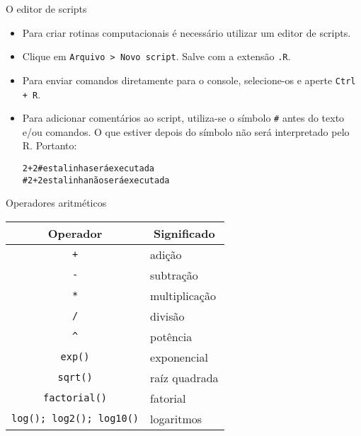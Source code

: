 \documentclass[10pt,handout]{beamer}\usepackage{graphicx, color}
\makeatletter
\newcommand{\hlcomment}[1]{\textcolor[rgb]{0.2,0.2,0.2}{#1}}%
\newenvironment{kframe}{%
 \def\at@end@of@kframe{}%
 \ifinner\ifhmode%
  \def\at@end@of@kframe{\end{minipage}}%
  \begin{minipage}{\columnwidth}%
 \fi\fi%
 \def\FrameCommand##1{\hskip\@totalleftmargin \hskip-\fboxsep
 \colorbox{shadecolor}{##1}\hskip-\fboxsep
     \hskip-\linewidth \hskip-\@totalleftmargin \hskip\columnwidth}%
 \MakeFramed {\advance\hsize-\width
   \@totalleftmargin\z@ \linewidth\hsize
   \@setminipage}}%
 {\par\unskip\endMakeFramed%
 \at@end@of@kframe}
\newenvironment{knitrout}{}{} %
\makeatother
\begin{document}
\begin{frame}[fragile=singleslide]{O editor de scripts}
  \begin{itemize}
  \item Para criar rotinas computacionais é necessário utilizar um editor
    de scripts.
  \item Clique em \texttt{Arquivo > Novo script}. Salve com a extensão
    \texttt{.R}.
  \item Para enviar comandos diretamente para o console, selecione-os e
    aperte \texttt{Ctrl + R}.
  \item Para adicionar comentários ao script, utiliza-se o símbolo
    \texttt{\#} antes do texto e/ou comandos. O que estiver depois do
    símbolo não será interpretado pelo R. Portanto:
\begin{knitrout}\small
{}\color{fgcolor}\begin{kframe}
\begin{alltt}
2 + 2     \hlcomment{# esta linha será executada}
\hlcomment{# 2 + 2     esta linha não será executada}
\end{alltt}
\end{kframe}
\end{knitrout}

\end{itemize}
\end{frame}


\begin{frame}[fragile=singleslide]{Operadores aritméticos}
\begin{table}[!ht]
    \centering
        \begin{tabular}{cl}
        \hline
        \multicolumn{0}{c}{Operador} & \multicolumn{1}{c}{Significado} \\
        \hline
        \verb|+| & adição \\
        \verb|-| & subtração \\
        \verb|*| & multiplicação \\
        \verb|/| & divisão \\
        \verb|^| & potência \\
        \verb|exp()| & exponencial \\
        \verb|sqrt()| & raíz quadrada \\
        \verb|factorial()| & fatorial \\
        \verb|log(); log2(); log10()| & logaritmos \\
        \hline
        \end{tabular}
\end{table}
\end{frame}
\end{document}
